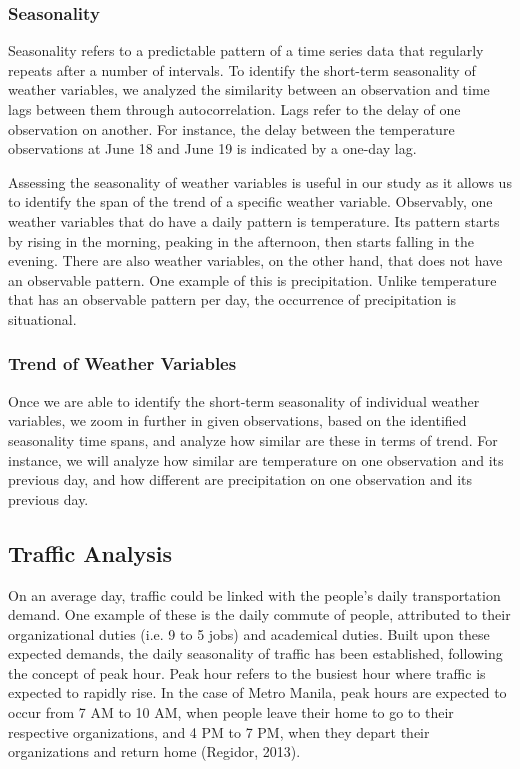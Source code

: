\subsubsection{Seasonality}
Seasonality refers to a predictable pattern of a time series data that regularly repeats after a number of intervals. To identify the short-term seasonality of weather variables, we analyzed the similarity between an observation and time lags between them through autocorrelation. Lags refer to the delay of one observation on another. For instance, the delay between the temperature observations at June 18 and June 19 is indicated by a one-day lag.

Assessing the seasonality of weather variables is useful in our study as it allows us to identify the span of the trend of a specific weather variable. Observably, one weather variables that do have a daily pattern is temperature. Its pattern starts by rising in the morning, peaking in the afternoon, then starts falling in the evening. There are also weather variables, on the other hand, that does not have an observable pattern. One example of this is precipitation. Unlike temperature that has an observable pattern per day, the occurrence of precipitation is situational.

\subsubsection{Trend of Weather Variables}
Once we are able to identify the short-term seasonality of individual weather variables, we zoom in further in given observations, based on the identified seasonality time spans, and analyze how similar are these in terms of trend. For instance, we will analyze how similar are temperature on one observation and its previous day, and how different are precipitation on one observation and its previous day.















\subsection{Traffic Analysis}
On an average day, traffic could be linked with the people's daily transportation demand. One example of these is the daily commute of people, attributed to their organizational duties (i.e. 9 to 5 jobs) and academical duties. Built upon these expected demands, the daily seasonality of traffic has been established, following the concept of peak hour. Peak hour refers to the busiest hour where traffic is expected to rapidly rise. In the case of Metro Manila, peak hours are expected to occur from 7 AM to 10 AM, when people leave their home to go to their respective organizations, and 4 PM to 7 PM, when they depart their organizations and return home (Regidor, 2013).

